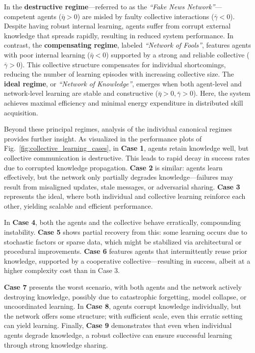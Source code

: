 \documentclass[12pt]{article}
\renewcommand{\emph}[1]{\textit{#1}}
\begin{document}
In the \textbf{destructive regime}---referred to as the \emph{``Fake News Network''}---competent agents ($\bar{\eta} > 0$) are misled by faulty collective interactions ($\bar{\gamma} < 0$). Despite having robust internal learning, agents suffer from corrupt external knowledge that spreads rapidly, resulting in reduced system performance. In contrast, the \textbf{compensating regime}, labeled \emph{``Network of Fools''}, features agents with poor internal learning ($\bar{\eta} < 0$) supported by a strong and reliable collective ($\bar{\gamma} > 0$). This collective structure compensates for individual shortcomings, reducing the number of learning episodes with increasing collective size. The \textbf{ideal regime}, or \emph{``Network of Knowledge''}, emerges when both agent-level and network-level learning are stable and constructive ($\bar{\eta} > 0, \bar{\gamma} > 0$). Here, the system achieves maximal efficiency and minimal energy expenditure in distributed skill acquisition.

Beyond these principal regimes, analysis of the individual canonical regimes provides further insight. As visualized in the performance plots of Fig.~\ref{fig:collective_learning_cases}, in \textbf{Case 1}, agents retain knowledge well, but collective communication is destructive. This leads to rapid decay in success rates due to corrupted knowledge propagation. \textbf{Case 2} is similar: agents learn effectively, but the network only partially degrades knowledge—failures may result from misaligned updates, stale messages, or adversarial sharing. \textbf{Case 3} represents the ideal, where both individual and collective learning reinforce each other, yielding scalable and efficient performance. 

In \textbf{Case 4}, both the agents and the collective behave erratically, compounding instability. \textbf{Case 5} shows partial recovery from this: some learning occurs due to stochastic factors or sparse data, which might be stabilized via architectural or procedural improvements. \textbf{Case 6} features agents that intermittently reuse prior knowledge, supported by a cooperative collective—resulting in success, albeit at a higher complexity cost than in Case 3.

\textbf{Case 7} presents the worst scenario, with both agents and the network actively destroying knowledge, possibly due to catastrophic forgetting, model collapse, or uncoordinated learning. In \textbf{Case 8}, agents corrupt knowledge individually, but the network offers some structure; with sufficient scale, even this erratic setting can yield learning. Finally, \textbf{Case 9} demonstrates that even when individual agents degrade knowledge, a robust collective can ensure successful learning through strong knowledge sharing.
\end{document}
